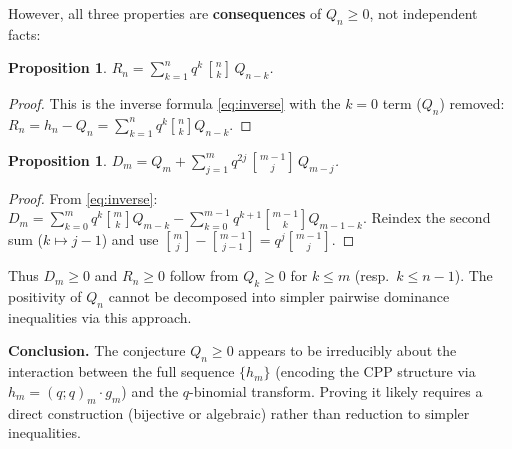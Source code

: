 \documentclass[11pt]{article}
\newtheorem{proposition}[theorem]{Proposition}
\newcommand{\qpochn}[3]{(#1;#2)_{#3}}
\newcommand{\qbin}[2]{\genfrac{[}{]}{0pt}{}{#1}{#2}}
\begin{document}
However, all three properties are \textbf{consequences} of $Q_n \geq 0$,
not independent facts:

\begin{proposition}
$R_n = \sum_{k=1}^{n} q^k\, \qbin{n}{k}\, Q_{n-k}$.
\end{proposition}

\begin{proof}
This is the inverse formula \eqref{eq:inverse} with the $k=0$ term
($Q_n$) removed: $R_n = h_n - Q_n = \sum_{k=1}^n q^k \qbin{n}{k} Q_{n-k}$.
\end{proof}

\begin{proposition}
$D_m = Q_m + \sum_{j=1}^{m} q^{2j}\, \qbin{m-1}{j}\, Q_{m-j}$.
\end{proposition}

\begin{proof}
From \eqref{eq:inverse}:
$D_m = \sum_{k=0}^m q^k \qbin{m}{k} Q_{m-k}
     - \sum_{k=0}^{m-1} q^{k+1} \qbin{m-1}{k} Q_{m-1-k}$.
Reindex the second sum ($k \mapsto j-1$) and use
$\qbin{m}{j} - \qbin{m-1}{j-1} = q^j \qbin{m-1}{j}$.
\end{proof}

Thus $D_m \geq 0$ and $R_n \geq 0$ follow from $Q_k \geq 0$ for
$k \leq m$ (resp.\ $k \leq n-1$).
The positivity of $Q_n$ cannot be decomposed into simpler
pairwise dominance inequalities via this approach.

\bigskip
\noindent\textbf{Conclusion.}
The conjecture $Q_n \geq 0$ appears to be irreducibly about the
interaction between the full sequence $\{h_m\}$ (encoding the CPP
structure via $h_m = \qpochn{q}{q}{m} \cdot g_m$) and the
$q$-binomial transform.  Proving it likely requires a direct
construction (bijective or algebraic) rather than reduction to
simpler inequalities.
\end{document}
